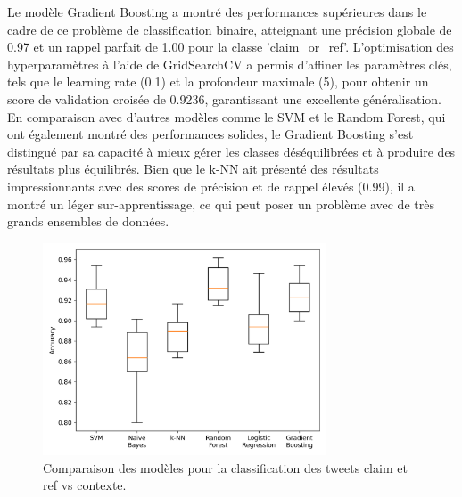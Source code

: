 Le modèle Gradient Boosting a montré des performances supérieures dans le cadre de ce problème de classification binaire, atteignant une précision globale de 0.97 et un rappel parfait de 1.00 pour la classe 'claim\_or\_ref'.
L'optimisation des hyperparamètres à l'aide de GridSearchCV a permis d'affiner les paramètres clés, tels que le learning rate (0.1) et la profondeur maximale (5), pour obtenir un score de validation croisée de 0.9236, garantissant une excellente généralisation.
En comparaison avec d'autres modèles comme le SVM et le Random Forest, qui ont également montré des performances solides, le Gradient Boosting s'est distingué par sa capacité à mieux gérer les classes déséquilibrées et à produire des résultats plus équilibrés.
Bien que le k-NN ait présenté des résultats impressionnants avec des scores de précision et de rappel élevés (0.99), il a montré un léger sur-apprentissage, ce qui peut poser un problème avec de très grands ensembles de données.

\begin{figure}[H]
    \centering
    \includegraphics[width=0.75\textwidth]{images/model_comparison_2}
    \caption{Comparaison des modèles pour la classification des tweets claim et ref vs contexte.}
    \label{fig:model_comparison_clmref_context}
\end{figure}

